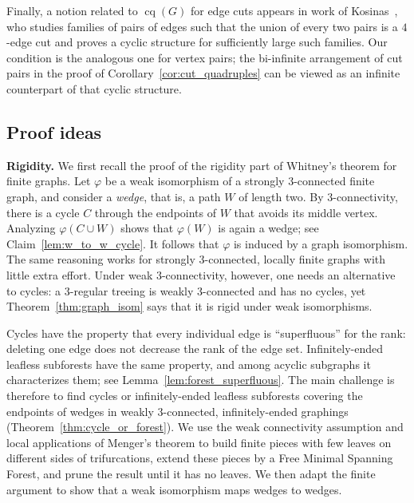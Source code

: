 \documentclass{article}
\theoremstyle{plain}
\theoremstyle{definition}
\begin{document}
Finally, a notion related to $\operatorname{cq}(G)$ for edge cuts appears in work of Kosinas~\cite{kosinas2024computing}, who studies families of pairs of edges such that the union of every two pairs is a $4$-edge cut and proves a cyclic structure for sufficiently large such families. Our condition is the analogous one for vertex pairs; the bi-infinite arrangement of cut pairs in the proof of Corollary~\ref{cor:cut_quadruples} can be viewed as an infinite counterpart of that cyclic structure.


\subsection{Proof ideas}\label{subsec:ideas_and_overview}

{\bf Rigidity.}
We first recall the proof of the rigidity part of Whitney's theorem for finite graphs. Let $\varphi$ be a weak isomorphism of a strongly $3$-connected finite graph, and consider a \emph{wedge}, that is, a path $W$ of length two. By $3$-connectivity, there is a cycle $C$ through the endpoints of $W$ that avoids its middle vertex. Analyzing $\varphi(C\cup W)$ shows that $\varphi(W)$ is again a wedge; see Claim~\ref{lem:w_to_w_cycle}. It follows that $\varphi$ is induced by a graph isomorphism. The same reasoning works for strongly $3$-connected, locally finite graphs with little extra effort. Under weak $3$-connectivity, however, one needs an alternative to cycles: a $3$-regular treeing is weakly $3$-connected and has no cycles, yet Theorem~\ref{thm:graph_isom} says that it is rigid under weak isomorphisms.

Cycles have the property that every individual edge is ``superfluous'' for the rank: deleting one edge does not decrease the rank of the edge set. Infinitely-ended leafless subforests have the same property, and among acyclic subgraphs it characterizes them; see Lemma~\ref{lem:forest_superfluous}. The main challenge is therefore to find cycles or infinitely-ended leafless subforests covering the endpoints of wedges in weakly $3$-connected, infinitely-ended graphings (Theorem~\ref{thm:cycle_or_forest}). We use the weak connectivity assumption and local applications of Menger's theorem to build finite pieces with few leaves on different sides of trifurcations, extend these pieces by a Free Minimal Spanning Forest, and prune the result until it has no leaves. We then adapt the finite argument to show that a weak isomorphism maps wedges to wedges.
\end{document}

